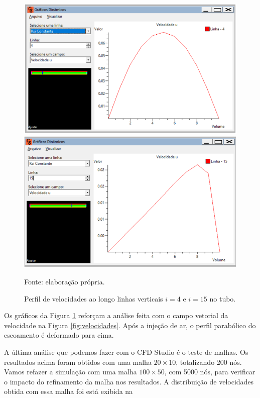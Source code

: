 \begin{figure}[h!]
    \caption{Perfil de velocidades ao longo linhas verticais $i = 4$ e $i = 15$ no tubo.}
    \label{fig:velocidadesLinha}
    \centering
    \centerline{\includegraphics[scale=0.5]{velocidadeLinha4.png}}
    \centerline{\includegraphics[scale=0.5]{velocidadeLinha15.png}}
    \par{Fonte: elaboração própria.}
\end{figure}

Os gráficos da Figura \ref*{fig:velocidadesLinha} reforçam a análise feita com o campo vetorial da velocidade 
na Figura \ref*{fig:velocidades}. Após a injeção de ar, o perfil parabólico do escoamento é deformado
para cima.

A última análise que podemos fazer com o CFD Studio é o teste de malhas. Os resultados acima 
foram obtidos com uma malha $20 \times 10$, totalizando 200 nós. Vamos refazer a simulação com
uma malha $100 \times 50$, com 5000 nós, para verificar o impacto do refinamento da malha nos resultados.
A distribuição de velocidades obtida com essa malha foi está exibida na 

